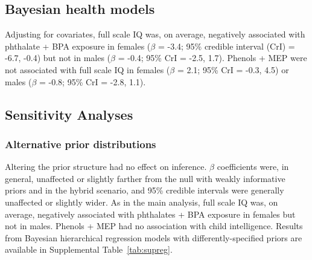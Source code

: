 \subsection{Bayesian health models}
Adjusting for covariates, full scale IQ was, on average, negatively associated with phthalate + BPA exposure in females ($\beta$ = -3.4; 95\% credible interval (CrI) = -6.7, -0.4) but not in males ($\beta$ = -0.4; 95\% CrI = -2.5, 1.7). Phenols + MEP were not associated with full scale IQ in females ($\beta$ = 2.1; 95\% CrI = -0.3, 4.5) or males ($\beta$ = -0.8; 95\% CrI = -2.8, 1.1). \\

\subsection{Sensitivity Analyses}
\subsubsection{Alternative prior distributions}
Altering the prior structure had no effect on inference. $\beta$ coefficients were, in general, unaffected or slightly farther from the null with weakly informative priors and in the hybrid scenario, and 95\% credible intervals were generally unaffected or slightly wider. As in the main analysis, full scale IQ was, on average, negatively associated with phthalates + BPA exposure in females but not in males. Phenols + MEP had no association with child intelligence. Results from Bayesian hierarchical regression models with differently-specified priors are available in Supplemental Table~\ref{tab:supreg}.

